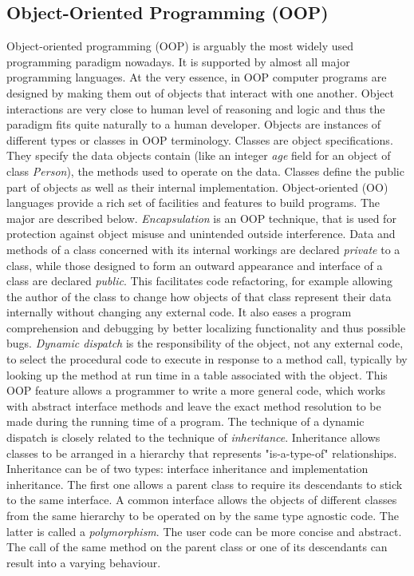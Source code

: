 \subsection{Object-Oriented Programming (OOP)}
\label{background_oop}
\quad Object-oriented programming (OOP) is arguably the most widely used programming paradigm nowadays. It is supported by almost all major programming languages. At the very essence, in OOP computer programs are designed by making them out of objects that interact with one another. Object interactions are very close to human level of reasoning and logic and thus the paradigm fits quite naturally to a human developer.\newline\null
\quad Objects are instances of different types or classes in OOP terminology. Classes are object specifications. They specify the data objects contain (like an integer \textit{age} field for an object of class \textit{Person}), the methods used to operate on the data. Classes define the public part of objects as well as their internal implementation. Object-oriented (OO) languages provide a rich set of facilities and features to build programs. The major are described below.\newline\null
\quad \textit{Encapsulation} is an OOP technique, that is used for protection against object misuse and unintended outside interference. Data and methods of a class concerned with its internal workings are declared \textit{private} to a class, while those designed to form an outward appearance and interface of a class are declared \textit{public}. This facilitates code refactoring, for example allowing the author of the class to change how objects of that class represent their data internally without changing any external code. It also eases a program comprehension and debugging by better localizing functionality and thus possible bugs.\newline\null
\quad \textit{Dynamic dispatch} is the responsibility of the object, not any external code, to select the procedural code to execute in response to a method call, typically by looking up the method at run time in a table associated with the object. This OOP feature allows a programmer to write a more general code, which works with abstract interface methods and leave the exact method resolution to be made during the running time of a program.\newline\null
\quad The technique of a dynamic dispatch is closely related to the technique of \textit{inheritance}. Inheritance allows classes to be arranged in a hierarchy that represents "is-a-type-of" relationships. Inheritance can be of two types: interface inheritance and implementation inheritance. The first one allows a parent class to require its descendants to stick to the same interface. A common interface allows the objects of different classes from the same hierarchy to be operated on by the same type agnostic code. The latter is called a \textit{polymorphism}. The user code can be more concise and abstract. The call of the same method on the parent class or one of its descendants can result into a varying behaviour.\newline\null

